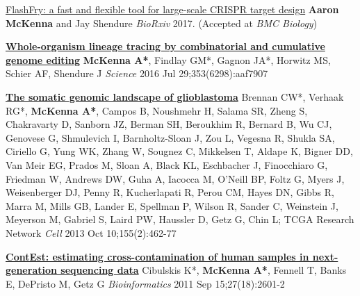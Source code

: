 \documentclass[9pt]{article}
\begin{document}
\bigskip


\noindent\href{https://doi.org/10.1101/189068}{FlashFry: a fast and flexible tool for large-scale CRISPR target design}
\newline\noindent \textbf{Aaron McKenna} and Jay Shendure
\newline\noindent\emph{ BioRxiv} 2017. (Accepted at \emph{BMC Biology})
\bigskip

\noindent\href{https://www.ncbi.nlm.nih.gov/pubmed/27229144}{\bf  Whole-organism lineage tracing by combinatorial and cumulative genome editing}\vspace{-0.03in}
\newline\noindent \textbf{McKenna A*}, Findlay GM*, Gagnon JA*, Horwitz MS, Schier AF, Shendure J
\newline\noindent\emph{ Science} 2016 Jul 29;353(6298):aaf7907
\bigskip

\noindent\href{https://www.ncbi.nlm.nih.gov/pubmed/24120142}{\bf  The somatic genomic landscape of glioblastoma}\vspace{-0.03in}
\newline\noindent Brennan CW*, Verhaak RG*, \textbf{McKenna A*}, Campos B, Noushmehr H, Salama SR, Zheng S, Chakravarty D, Sanborn JZ, Berman SH, Beroukhim R, Bernard B, Wu CJ, Genovese G,  Shmulevich I, Barnholtz-Sloan J, Zou L, Vegesna R, Shukla SA, Ciriello G, Yung WK, Zhang W, Sougnez C, Mikkelsen T, Aldape K, Bigner DD, Van Meir EG, Prados M,  Sloan A, Black KL, Eschbacher J, Finocchiaro G, Friedman W, Andrews DW, Guha A, Iacocca M, O'Neill BP, Foltz G, Myers J, Weisenberger DJ, Penny R, Kucherlapati R, Perou CM, Hayes DN, Gibbs R, Marra M, Mills GB, Lander E, Spellman P, Wilson R, Sander C, Weinstein J, Meyerson M, Gabriel S, Laird PW, Haussler D, Getz G, Chin L; TCGA Research Network
\newline\noindent\emph{ Cell} 2013 Oct 10;155(2):462-77
\bigskip

\noindent\href{https://www.ncbi.nlm.nih.gov/pubmed/21803805}{\bf  ContEst: estimating cross-contamination of human samples in next-generation sequencing data}\vspace{-0.03in}
\newline\noindent Cibulskis K*, \textbf{McKenna A*}, Fennell T, Banks E, DePristo M, Getz G
\newline\noindent\emph{ Bioinformatics} 2011 Sep 15;27(18):2601-2
\bigskip
\end{document}
